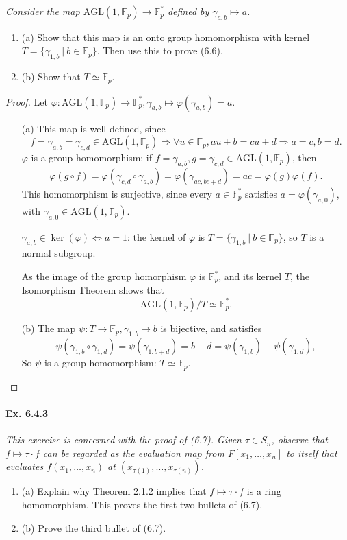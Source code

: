 \documentclass[11pt,a4paper]{article}
\newcommand{\be} {\begin{enumerate}}
\newcommand{\ee} {\end{enumerate}}
\newcommand{\F}{\mathbb{F}}
\begin{document}
{\it Consider the map $\mathrm{AGL}(1,\F_p) \to \F_p^*$ defined by $\gamma_{a,b} \mapsto a$.
\be
\item[(a)] Show that this map is an onto group homomorphism with kernel $T = \{\gamma_{1,b} \ | \ b\in \F_p\}$. Then use this to prove (6.6).
\item[(b)] Show that $T \simeq \F_p$.
\ee
}

\begin{proof}
Let $\varphi :  \mathrm{AGL}(1,\F_p) \to \F_p^*, \gamma_{a,b} \mapsto  \varphi(\gamma_{a,b}) =a$.
\begin{enumerate}
\item[(a)] This map is well defined, since 
$$f = \gamma_{a,b} = \gamma_{c,d} \in \mathrm{AGL}(1,\F_p) \Rightarrow \forall u \in \F_p, au+b = cu+d \Rightarrow a=c,b=d.$$
$\varphi$ is a group homomorphism: if $f = \gamma_{a,b} , g = \gamma_{c,d} \in \mathrm{AGL}(1,\F_p)$, then
$$\varphi(g\circ f) = \varphi(\gamma_{c,d} \circ \gamma_{a,b}) = \varphi(\gamma_{ac,bc+d}) = ac =\varphi(g) \varphi(f).$$
This homomorphism is surjective, since every  $a\in \F_p^*$ satisfies $a = \varphi(\gamma_{a,0})$, with $\gamma_{a,0} \in \mathrm{AGL}(1,\F_p)$.

$\gamma_{a,b} \in \ker(\varphi) \iff a = 1$: the kernel of $\varphi$ is $T = \{\gamma_{1,b} \ \vert  \ b \in \F_p\}$, so $T$ is a normal subgroup.

As the image of the group homorphism $\varphi$ is $\F_p^*$, and its kernel $T$, the Isomorphism Theorem shows that
$$\mathrm{AGL}(1,\F_p)/T \simeq \F_p^*.$$

\item[(b)]
The map $\psi : T \to \F_p, \gamma_{1,b} \mapsto b$ is bijective, and satisfies $$\psi(\gamma_{1,b} \circ \gamma_{1,d}) = \psi(\gamma_{1,b+d}) = b+d = \psi(\gamma_{1,b})+\psi(\gamma_{1,d}),$$ 
So $\psi$ is a group homomorphism: $T \simeq \F_p$.

\end{enumerate}
\end{proof}

\paragraph{Ex. 6.4.3}

{\it This exercise is concerned with the proof of (6.7). Given $\tau \in S_n$, observe that $f\mapsto \tau \cdot f$ can be regarded as the evaluation map from $F[x_1,\ldots,x_n]$ to itself that evaluates $f(x_1,\ldots,x_n)$ at $(x_{\tau(1)},\ldots,x_{\tau(n)})$.
\be
\item[(a)] Explain why Theorem 2.1.2 implies that $f \mapsto \tau \cdot f$ is a ring homomorphism. This proves the first two bullets of (6.7).
\item[(b)] Prove the third bullet of (6.7).
\ee
}
\end{document}
